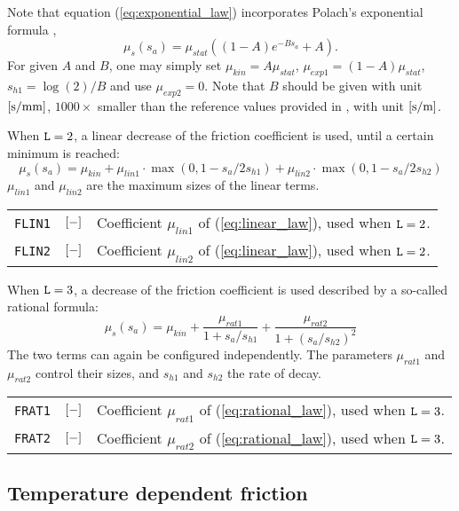 \documentclass[12pt]{report}
\newenvironment{inputvars}{\vspace{0.4\baselineskip}%

\begin{tabular}{>{\raggedright}p{22mm}p{19mm}p{113mm}}}{
\end{tabular}

}
\newcommand{\inpvar}[3]{{\small\tt #1} & $#2$ & #3 \\[1ex]}
\begin{document}
Note that equation (\ref{eq:exponential_law}) incorporates Polach's
exponential formula \cite{Polach2005},
\begin{equation}\label{eq:polach_law}
   \mu_s(s_a) = \mu_{stat} \left( (1-A) e^{-B s_a} + A \right) .
\end{equation}
For given $A$ and $B$, one may simply set $\mu_{kin}=A\mu_{stat}$,
$\mu_{exp1}=(1-A)\mu_{stat}$, $s_{h1}=\log(2)/B$ and use $\mu_{exp2}=0$.
Note that $B$ should be given with unit $[\mathrm{s/mm}]$, $1000\times$ smaller
than the reference values provided in \cite{Polach2005}, with unit
$[\mathrm{s/m}]$.

When ${\tt L}=2$, a linear decrease of the friction coefficient is used,
until a certain minimum is reached:
\begin{equation}\label{eq:linear_law}
   \mu_s(s_a) = \mu_{kin} +
           \mu_{lin1} \cdot \max( 0, 1 - s_a/2s_{h1} ) +
           \mu_{lin2} \cdot \max( 0, 1 - s_a/2s_{h2} )
\end{equation}
$\mu_{lin1}$ and $\mu_{lin2}$ are the maximum sizes of the linear terms.
\begin{inputvars}
\inpvar{FLIN1}{\bunit{-}}{Coefficient $\mu_{lin1}$ of (\ref{eq:linear_law}),
        used when ${\tt L}=2$.}
\inpvar{FLIN2}{\bunit{-}}{Coefficient $\mu_{lin2}$ of (\ref{eq:linear_law}),
        used when ${\tt L}=2$.}
\end{inputvars}

When ${\tt L}=3$, a decrease of the friction coefficient is used described by
a so-called rational formula:
\begin{equation}\label{eq:rational_law}
   \mu_s(s_a) = \mu_{kin} +
        \frac{\mu_{rat1}}{1+s_a/s_{h1}} +
        \frac{\mu_{rat2}}{1+(s_a/s_{h2})^2}
\end{equation}
The two terms can again be configured independently. The parameters
$\mu_{rat1}$ and $\mu_{rat2}$ control their sizes, and $s_{h1}$ and
$s_{h2}$ the rate of decay.
\begin{inputvars}
\inpvar{FRAT1}{\bunit{-}}{Coefficient $\mu_{rat1}$ of (\ref{eq:rational_law}),
        used when ${\tt L}=3$.}
\inpvar{FRAT2}{\bunit{-}}{Coefficient $\mu_{rat2}$ of (\ref{eq:rational_law}),
        used when ${\tt L}=3$.}
\end{inputvars}

\subsection{Temperature dependent friction}
\label{sec:temp_dep_friction}
\end{document}

